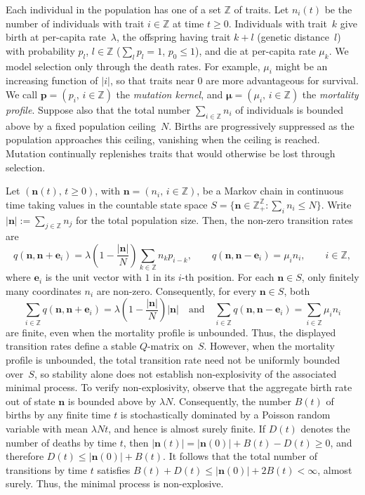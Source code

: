 \documentclass[12pt]{article}
\newcommand{\Z}{\ensuremath{\mathbb Z}}
\renewcommand{\iff}{iff}
\newcommand{\bp}{\boldsymbol{p}}
\newcommand{\bn}{\boldsymbol{n}}
\newcommand{\be}{\boldsymbol{e}}
\newcommand{\bmu}{\boldsymbol{\mu}}
\begin{document}
Each individual in the population has one of a set $\Z$ of traits. Let
$n_i(t)$ be the number of individuals with trait $i\in \Z$ at time
$t\geq 0$. Individuals with
trait~$k$ give birth at per-capita rate~$\lambda$, the offspring having
trait $k+l$ (genetic distance~$l$) with probability $p_l$, $l\in \Z$
($\sum_l p_l=1$, $p_0\leq 1$), and die at per-capita rate $\mu_k$. We
model selection only through the death rates. For example, $\mu_i$ might
be an increasing function of $|i|$, so that traits near $0$ are more
advantageous for survival. We call $\bp=(p_i,\, i\in \Z)$ 
the {\em mutation kernel\/}, and $\bmu=(\mu_i,\, i\in \Z)$ the
{\em mortality profile\/}. 
Suppose also that the total number $\sum_{i\in \Z} n_i$ of
individuals is bounded above by a fixed population ceiling~$N$. Births
are progressively suppressed as the population approaches this ceiling,
vanishing when the ceiling is reached. Mutation continually replenishes
traits that would otherwise be lost through selection.

Let $(\bn(t),\, t\geq 0)$, with $\bn=(n_i,\,
i\in \Z)$, be a Markov chain in continuous time taking values in
the countable state space
$S=\{\bn\in \Z_+^{\Z}: \sum_i n_i\leq N\}$.
Write $|\bn|:=\sum_{j\in\Z}n_j$ for the total population size.
Then, the non-zero transition rates are 
\begin{equation}
q(\bn,\bn+\be_i)
=
\lambda\left(1-\frac{|\bn|}{N}\right)
\sum_{k\in\Z}n_kp_{i-k},
\qquad
q(\bn,\bn-\be_i)=\mu_i n_i,
\qquad i\in\Z,
\label{TheModel}
\end{equation}
where $\be_i$ is the unit vector with $1$ in its $i$-th position.
For each $\bn\in S$, only finitely many coordinates $n_i$ are non-zero.
Consequently, for every $\bn\in S$, both
$$
\sum_{i\in\Z}q(\bn,\bn+\be_i)
=
\lambda\left(1-\frac{|\bn|}{N}\right)|\bn|
\quad\text{and}\quad
\sum_{i\in\Z}q(\bn,\bn-\be_i)
=
\sum_{i\in\Z}\mu_i n_i
$$
are finite, even when the mortality profile is unbounded. Thus, the
displayed transition rates define a stable $Q$-matrix on~$S$. However,
when the mortality profile is unbounded, the total transition rate need
not be uniformly bounded over~$S$, so stability alone does not establish
non-explosivity of the associated minimal process. To verify
non-explosivity, observe that the aggregate birth rate out of state
$\bn$ is bounded above by $\lambda N$. Consequently, the number $B(t)$
of births by any finite time $t$ is stochastically dominated by a
Poisson random variable with mean $\lambda Nt$, and hence is almost
surely finite. If $D(t)$ denotes the number of deaths by time $t$, then
$|\bn(t)|=|\bn(0)|+B(t)-D(t)\geq 0$, and therefore
$D(t)\leq|\bn(0)|+B(t)$. It follows that the total number of transitions
by time $t$ satisfies $B(t)+D(t)\leq|\bn(0)|+2B(t)<\infty$, almost
surely. Thus, the minimal process is non-explosive.
\end{document}
